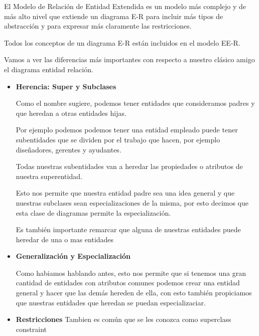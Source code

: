 \documentclass[12pt, fleqn]{report}                             %
\begin{document}
            El Modelo de Relación de Entidad Extendida es un modelo más complejo y de más
            alto nivel que extiende un diagrama E-R para incluir más tipos de abstracción
            y para expresar más claramente las restricciones.

            Todos los conceptos de un diagrama E-R están incluidos en el modelo EE-R.

            Vamos a ver las diferencias más importantes con respecto a nuestro clásico amigo
            el diagrama entidad relación.

            \begin{itemize}
                \item
                    \textbf{Herencia: Super y Subclases}

                    Como el nombre sugiere, podemos tener entidades que consideramos padres
                    y que heredan a otras entidades hijas.

                    Por ejemplo podemos podemos tener una entidad empleado puede tener
                    subentidades que se dividen por el trabajo que hacen, por ejemplo
                    diseñadores, gerentes y ayudantes.

                    Todas nuestras subentidades van a heredar las propiedades o atributos
                    de nuestra superentidad.

                    Esto nos permite que nuestra entidad padre sea una idea general y que
                    nuestras subclases sean especializaciones de la misma, por esto decimos
                    que esta clase de diagramas permite la especialización.


                    Es también importante remarcar que alguna de nuestras entidades
                    puede heredar de una o mas entidades


                \item
                    \textbf{Generalización y Especialización}

                    Como habiamos hablando antes, esto nos permite que si tenemos
                    una gran cantidad de entidades con atributos comunes podemos 
                    crear una entidad general y hacer que las demás hereden de ella,
                    con esto también propiciamos que nuestras entidades que heredan 
                    se puedan especializaciar.


                \item
                    \textbf{Restricciones}
                        Tambien es común que se les conozca como superclass constraint


\end{itemize}
\end{document}
